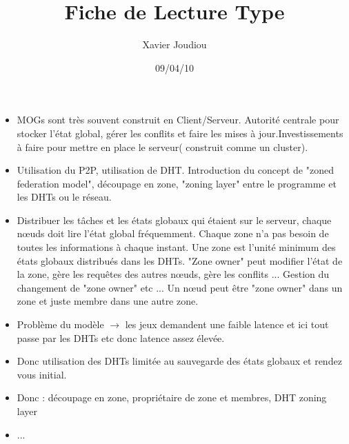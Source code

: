 \documentclass[11pt,a4paper]{article}
\title{Fiche de Lecture Type}
\author{Xavier Joudiou}
\date{09/04/10}
\begin{document}
	
  \begin{itemize}
  \renewcommand{\labelitemi}{$\Rightarrow$}
	\item MOGs sont très souvent construit en Client/Serveur. Autorité centrale pour stocker l'état global, gérer les conflits et faire les mises à jour.Investissements à faire pour mettre en place le serveur( construit comme un cluster).
	\item Utilisation du P2P, utilisation de DHT. Introduction du concept de "zoned federation model", découpage en zone, "zoning layer" entre le programme et les DHTs ou le réseau. 
	\item Distribuer les tâches et les états globaux qui étaient sur le serveur, chaque nœuds doit lire l'état global fréquemment. Chaque zone n'a pas besoin de toutes les informations à chaque instant. Une zone est l'unité minimum des états globaux distribués dans les DHTs. "Zone owner" peut modifier l'état de la zone, gère les requêtes des autres nœuds, gère les conflits ... Gestion du changement de "zone owner" etc ... Un nœud peut être "zone owner" dans un zone et juste membre dans une autre zone.
	\item Problème du modèle $\rightarrow$ les jeux demandent une faible latence et ici tout passe par les DHTs etc donc latence assez élevée.
	\item Donc utilisation des DHTs limitée au sauvegarde des états globaux et rendez vous initial.
	\item Donc : découpage en zone, propriétaire de zone et membres, DHT zoning layer
	\item ...
  \end{itemize}
\end{document}
